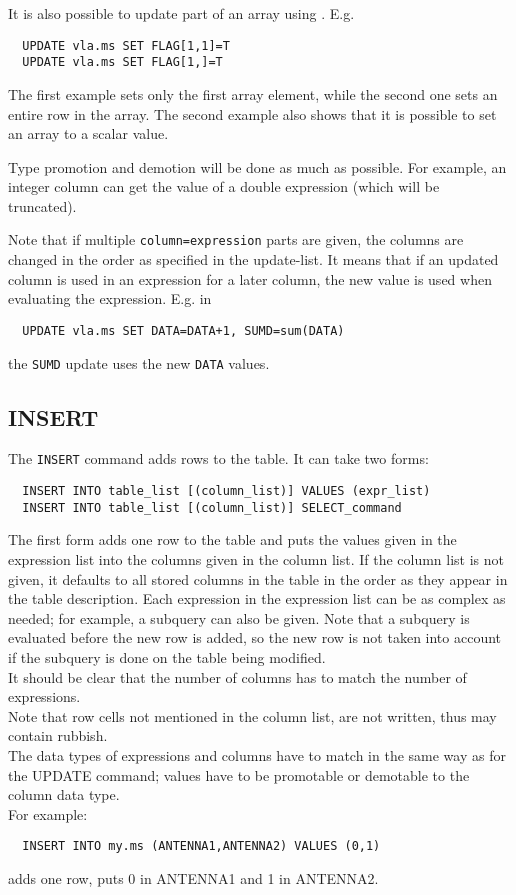 It is also possible to update part of an array using
. E.g.
\begin{verbatim}
  UPDATE vla.ms SET FLAG[1,1]=T
  UPDATE vla.ms SET FLAG[1,]=T
\end{verbatim}
The first example sets only the first array element, while the second
one sets an entire row in the array. The second example also
shows that it is possible to set an array to a scalar value.

Type promotion and demotion will be done as much as possible.
For example, an integer column can get the value of a double
expression (which will be truncated).

Note that if multiple \texttt{column=expression} parts are given,
the columns are changed in the order as specified in the update-list.
It means that if an updated column is used in an expression for
a later column, the new value is used when evaluating the
expression. E.g. in
\begin{verbatim}
  UPDATE vla.ms SET DATA=DATA+1, SUMD=sum(DATA)
\end{verbatim}
the \texttt{SUMD} update uses the new \texttt{DATA} values.
    

\subsection{INSERT}
The \texttt{INSERT} command adds rows to the table. It can take two forms:
\begin{verbatim}
  INSERT INTO table_list [(column_list)] VALUES (expr_list)
  INSERT INTO table_list [(column_list)] SELECT_command
\end{verbatim}
The first form adds one row to the table and puts the values given in
the expression list into the columns given in the column list.
If the column list is not given, it defaults to all stored columns in
the table in the order as they appear in the table description.
Each expression in the expression list can be as complex as needed;
for example, a subquery can also be given. Note that a subquery is
evaluated before the new row is added, so the new row is not taken
into account if the subquery is done on the table being modified.
\\It should be clear that the number of columns has to match the
number of expressions.
\\Note that row cells not mentioned in the column list,
are not written, thus may contain rubbish.
\\The data types of expressions and columns have to match in the same way
as for the UPDATE command; values have to be promotable or demotable
to the column data type.
\\For example:
\begin{verbatim}
  INSERT INTO my.ms (ANTENNA1,ANTENNA2) VALUES (0,1)
\end{verbatim}
adds one row, puts 0 in ANTENNA1 and 1 in ANTENNA2.

